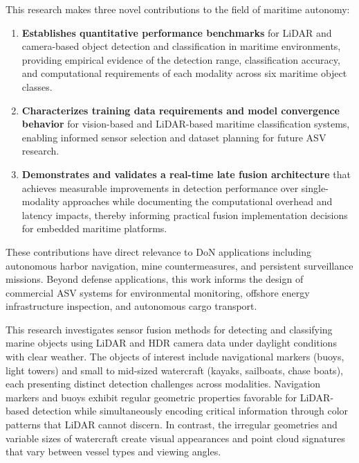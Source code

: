 \documentclass[../main.tex]{subfiles}
\begin{document}
This research makes three novel contributions to the field of maritime autonomy:

\begin{enumerate}
    \item \textbf{Establishes quantitative performance benchmarks} for \ac{LiDAR} and camera-based object detection and classification in maritime environments, providing empirical evidence of the detection range, classification accuracy, and computational requirements of each modality across six maritime object classes.

    \item \textbf{Characterizes training data requirements and model convergence behavior} for vision-based and \ac{LiDAR}-based maritime classification systems, enabling informed sensor selection and dataset planning for future \ac{ASV} research.

    \item \textbf{Demonstrates and validates a real-time late fusion architecture} that achieves measurable improvements in detection performance over single-modality approaches while documenting the computational overhead and latency impacts, thereby informing practical fusion implementation decisions for embedded maritime platforms.
\end{enumerate}

These contributions have direct relevance to \ac{DoN} applications including autonomous harbor navigation, mine countermeasures, and persistent surveillance missions.
Beyond defense applications, this work informs the design of commercial \ac{ASV} systems for environmental monitoring, offshore energy infrastructure inspection, and autonomous cargo transport.

This research investigates sensor fusion methods for detecting and classifying marine objects using \ac{LiDAR} and \ac{HDR} camera data under daylight conditions with clear weather.
The objects of interest include navigational markers (buoys, light towers) and small to mid-sized watercraft (kayaks, sailboats, chase boats), each presenting distinct detection challenges across modalities.
Navigation markers and buoys exhibit regular geometric properties favorable for \ac{LiDAR}-based detection while simultaneously encoding critical information through color patterns that \ac{LiDAR} cannot discern.
In contrast, the irregular geometries and variable sizes of watercraft create visual appearances and point cloud signatures that vary between vessel types and viewing angles.
\end{document}
